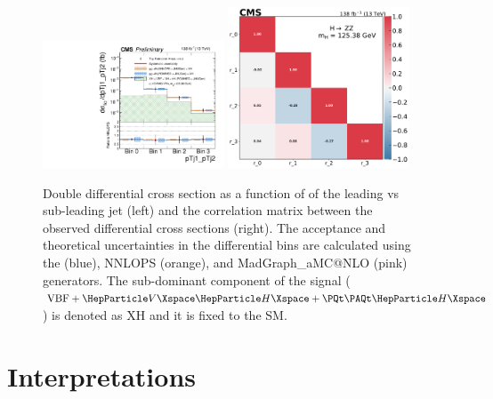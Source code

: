 \begin{center}
	\begin{figure}[!htb]
		\centering
		\includegraphics[width=0.48\textwidth]{Images/H4L/doublediff/pTj1_pTj2_unfoldwith_SM_125_logscale_asimov.pdf}
		\includegraphics[width=0.48\textwidth]{Images/H4L/correlations/corr_pTj1_pTj2_v3.pdf}\\
		\caption{
			Double differential cross section as a function of \pt of the leading  vs sub-leading jet (left) and the correlation matrix between the observed differential cross sections (right).
			The acceptance and theoretical uncertainties in the differential bins are calculated using the \POWHEG (blue), NNLOPS (orange), and MadGraph\_aMC@NLO (pink) generators.
			The sub-dominant component of the signal ($\VBF + \VH + \ttH$) is denoted as XH and it is fixed to the SM.
			\label{fig:fidPTJ1PTJ2}}
	\end{figure}
\end{center}
\clearpage

\section{Interpretations}
\label{sec:interpretations}

